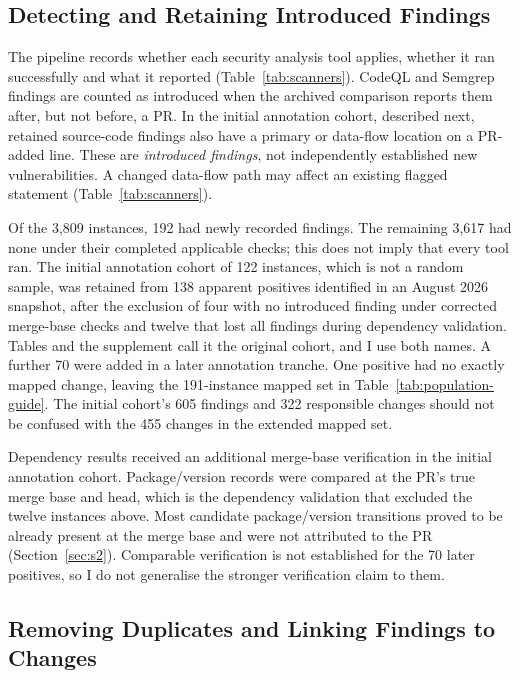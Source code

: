 \documentclass[acmsmall,screen,nonacm,review]{acmart}
\begin{document}
\subsection{Detecting and Retaining Introduced Findings}

The pipeline records whether each security analysis tool applies, whether it ran successfully and what it reported (Table~\ref{tab:scanners}). CodeQL and Semgrep findings are counted as introduced when the archived comparison reports them after, but not before, a PR. In the initial annotation cohort, described next, retained source-code findings also have a primary or data-flow location on a PR-added line. These are \emph{introduced findings}, not independently established new vulnerabilities. A changed data-flow path may affect an existing flagged statement (Table~\ref{tab:scanners}).

Of the 3,809 instances, 192 had newly recorded findings. The remaining 3,617 had none under their completed applicable checks; this does not imply that every tool ran. The initial annotation cohort of 122 instances, which is not a random sample, was retained from 138 apparent positives identified in an August 2026 snapshot, after the exclusion of four with no introduced finding under corrected merge-base checks and twelve that lost all findings during dependency validation. Tables and the supplement call it the original cohort, and I use both names. A further 70 were added in a later annotation tranche. One positive had no exactly mapped change, leaving the 191-instance mapped set in Table~\ref{tab:population-guide}. The initial cohort's 605 findings and 322 responsible changes should not be confused with the 455 changes in the extended mapped set.

Dependency results received an additional merge-base verification in the initial annotation cohort. Package/version records were compared at the PR's true merge base and head, which is the dependency validation that excluded the twelve instances above. Most candidate package/version transitions proved to be already present at the merge base and were not attributed to the PR (Section~\ref{sec:s2}). Comparable verification is not established for the 70 later positives, so I do not generalise the stronger verification claim to them.

\subsection{Removing Duplicates and Linking Findings to Changes}\label{sec:attrib}
\end{document}
